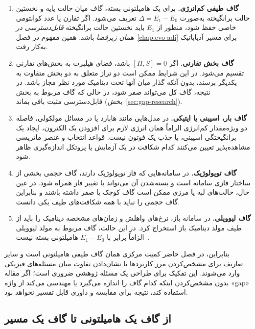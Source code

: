 \begin{enumerate}
	\item \textbf{گاف طیفی کم‌انرژی.}
	برای یک هامیلتونی بسته، گاف میان حالت پایه و نخستین حالت برانگیخته به‌صورت
	$\Delta=E_1-E_0$
	تعریف می‌شود.
	اگر تقارن یا عدد کوانتومی خاصی حفظ شود، منظور از $E_1$ باید نخستین حالت برانگیخته \emph{قابل‌دسترسی در همان زیرفضا} باشد.
	همین مفهوم در فصل~\ref{chap:evo-adi} برای مسیر آدیاباتیک به‌کار رفت.
	

	\item \textbf{گاف بخش تقارنی.}
	اگر
	$[H,S]=0$
	باشد، فضای هیلبرت به بخش‌های تقارنی تقسیم می‌شود.
	در این شرایط ممکن است دو تراز متعلق به دو بخش متفاوت به یکدیگر برسند، بدون آنکه گذار میان آنها تحت دینامیک مورد نظر مجاز باشد.
	در نتیجه، گاف کل می‌تواند صفر شود، در حالی که گاف مربوط به بخش قابل‌دسترسی مثبت باقی بماند (بخش~\ref{sec:gap-research}).
	
	\item \textbf{گاف بار، اسپینی یا اپتیکی.}
	در مدل‌هایی مانند هابارد یا در مسائل مولکولی، فاصله دو ویژه‌مقدار کم‌انرژی الزاماً همان انرژی لازم برای افزودن یک الکترون، ایجاد یک برانگیختگی اسپینی، یا جذب یک فوتون نیست.
	قواعد انتخاب و عنصر ماتریسی مشاهده‌پذیر تعیین می‌کنند کدام شکافت در یک آزمایش یا پروتکل اندازه‌گیری ظاهر شود.
	
	\item \textbf{گاف توپولوژیک.}
	در سامانه‌هایی که فاز توپولوژیک دارند، گاف حجمی بخشی از ساختار فازی سامانه است و بسته‌شدن آن می‌تواند با تغییر فاز همراه شود.
	در عین حال، حالت‌های لبه یا مرزی ممکن است گاف کوچک یا صفر داشته باشند و بنابراین گاف حجمی را نباید با همه شکافت‌های طیف یکی دانست.
	
	\item \textbf{گاف لیوویلی.}
	در سامانه باز، نرخ‌های واهلش و زمان‌های مشخصه دینامیک را باید از طیف مولد دینامیک باز استخراج کرد.
	در این حالت، گاف مربوط به مولد لیوویلی الزاماً برابر با $E_1-E_0$ هامیلتونی بسته نیست~\cite{GapSels2017}.
\end{enumerate}
بنابراین، در فصل حاضر کمیت مرکزی همان گاف طیفی هامیلتونی است و سایر تعاریف برای مشخص‌کردن مرز کاربردها یا نشان‌دادن تفاوت میان مسئله‌های فیزیکی وارد می‌شوند.
این تفکیک برای طراحی یک مسئله ژوهشی ضروری است؛ اگر مقاله بدون مشخص‌کردن اینکه کدام گاف را اندازه می‌گیرد یا مهندسی می‌کند از واژه «gap» استفاده کند، نتیجه برای مقایسه و داوری قابل تفسیر نخواهد بود.

\subsection{از گاف یک هامیلتونی تا گاف یک مسیر}

